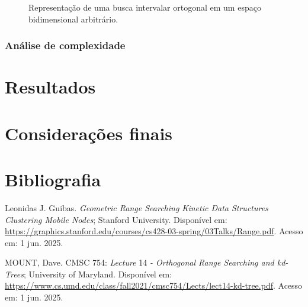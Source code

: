 \documentclass{article}
\begin{document}
\begin{adjustwidth}{-1.5cm}{-1.5cm}
\begin{figure}[h]
\centering
{}
\caption{Representação de uma busca intervalar ortogonal em um espaço bidimensional arbitrário.}
\end{figure}




\subsubsection{Análise de complexidade}

\section{Resultados}

\section{Considerações finais}

\section{Bibliografia}

\begin{thebibliography}{99}

Leonidas J. Guibas. \textit{Geometric Range Searching
Kinetic Data Structures
Clustering Mobile Nodes}; Stanford University. Disponível em: \url{https://graphics.stanford.edu/courses/cs428-03-spring/03Talks/Range.pdf}. Acesso em: 1 jun. 2025.

MOUNT, Dave. CMSC 754: \textit{Lecture} 14 \textit{- Orthogonal Range Searching and kd-Trees}; University of Maryland. Disponível em: \url{https://www.cs.umd.edu/class/fall2021/cmsc754/Lects/lect14-kd-tree.pdf}. Acesso em: 1 jun. 2025.

\end{thebibliography}




\end{adjustwidth}
\end{document}

